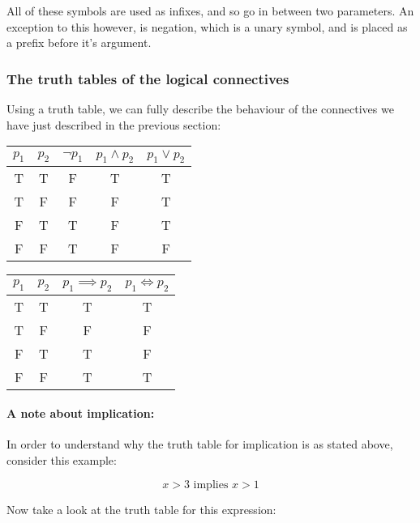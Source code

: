 
All of these symbols are used as infixes, and so go in between two parameters.
An exception to this however, is negation, which is a unary symbol, and is
placed as a prefix before it's argument.


\subsubsection{The truth tables of the logical connectives}

Using a truth table, we can fully describe the behaviour of the connectives we
have just described in the previous section:

\begin{center}
	\begin{tabular}{|c|c|c|c|c|}
		\hline
		$p_1$& $p_2$& $\neg p_1$& $p_1 \wedge p_2$& $p_1 \vee p_2$\\ \hline
		T& T& F& T &T\\
		T& F& F& F &T\\
		F& T& T& F &T\\
		F& F& T& F &F\\ \hline
	\end{tabular}
	\begin{tabular}{|c|c|c|c|}
		\hline
		$p_1$& $p_2$& $p_1 \implies p_2$& $p_1 \iff p_2$\\ \hline
		T& T& T &T\\
		T& F& F &F\\
		F& T& T &F\\
		F& F& T &T\\ \hline
	\end{tabular}
\end{center}

\paragraph{A note about implication:}
In order to understand why the truth table for implication is as stated above,
consider this example:

\begin{dmath*}
	{x > 3 \textrm{ implies } x > 1}
\end{dmath*}

Now take a look at the truth table for this expression:

